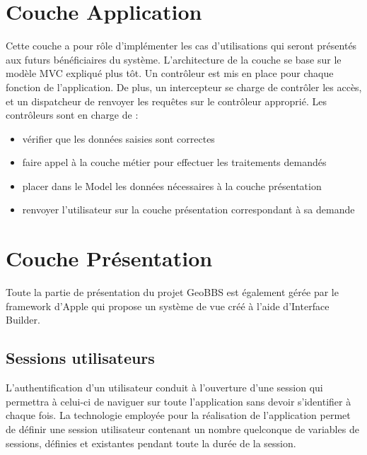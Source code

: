\documentclass[a4paper,12pt]{report}
\begin{document}
\begin{onehalfspace}
\section{Couche Application}
Cette couche a pour rôle d’implémenter les cas d’utilisations qui seront présentés aux futurs bénéficiaires du système. L’architecture de la couche se base sur le modèle MVC expliqué plus tôt. Un contrôleur est mis en place pour chaque fonction de l’application. De plus, un intercepteur se charge de contrôler les accès, et un dispatcheur de renvoyer les requêtes sur le contrôleur approprié. Les contrôleurs sont en charge de :
\begin{itemize}
  \item vérifier que les données saisies sont correctes
  \item faire appel à la couche métier pour effectuer les traitements demandés
  \item placer dans le Model les données nécessaires à la couche présentation
  \item renvoyer l’utilisateur sur la couche présentation correspondant à sa demande
\end{itemize}

\section{Couche Présentation}
Toute la partie de présentation du projet GeoBBS est également gérée par le framework d'Apple qui propose un système de vue créé à l'aide d'Interface Builder.

\subsection{Sessions utilisateurs}
L’authentification d’un utilisateur conduit à l’ouverture d’une session qui permettra à celui-ci de naviguer sur toute l'application sans devoir s’identifier à chaque fois. La technologie employée pour la réalisation de l'application permet de définir une session utilisateur contenant un nombre quelconque de variables de sessions, définies et existantes pendant toute la durée de la session.


\end{onehalfspace}
\end{document}

